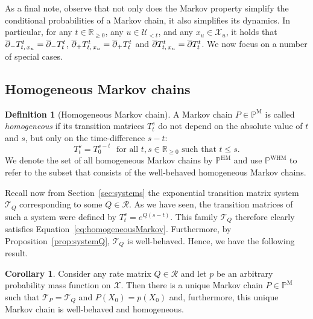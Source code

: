 \documentclass[10pt,a4paper]{paper}
\theoremstyle{definition}
\newtheorem{corollary}[theorem]{Corollary}
\newtheorem{definition}{Definition}
\newcommand{\reals}{\mathbb{R}}
\newcommand{\realsnonneg}{\reals_{\geq 0}}
\newcommand{\states}{\mathcal{X}}
\newcommand{\processes}{\mathbb{P}}
\newcommand{\mprocesses}{\processes^{\mathrm{M}}}
\newcommand{\hmprocesses}{\processes^{\mathrm{HM}}}
\newcommand{\whmprocesses}{\processes^{\mathrm{WHM}}}
\begin{document}
As a final note, observe that not only does the Markov property simplify the conditional probabilities of a Markov chain, it also simplifies its dynamics. In particular, for any $t\in\realsnonneg$, any $u\in\mathcal{U}_{<t}$, and any $x_u\in\states_u$, it holds that $\smash{\overline{\partial}_-}T_{t,\,x_u}^t=\smash{\overline{\partial}_-}T_{t}^t$, $\smash{\overline{\partial}_+}T_{t,\,x_u}^t=\smash{\overline{\partial}_+}T_{t}^t$ and $\smash{\overline{\partial}}T_{t,\,x_u}^t=\smash{\overline{\partial}}T_{t}^t$. We now focus on a number of special cases.

\subsection{Homogeneous Markov chains}\label{sec:homogen_markov_chain}

\begin{definition}[Homogeneous Markov chain]\label{def:homogeneousMarkov}
A Markov chain $P\in\mprocesses$ is called \emph{homogeneous} if its transition matrices $T_t^s$ do not depend on the absolute value of $t$ and $s$, but only on the time-difference $s-t$:
\begin{equation}\label{eq:homogeneousMarkov}
T_t^s=T_0^{s-t}
\text{~~for all $t,s\in\realsnonneg$ such that $t\leq s$.}
\end{equation}
We denote the set of all homogeneous Markov chains by $\hmprocesses$ and use $\whmprocesses$ to refer to the subset that consists of the well-behaved homogeneous Markov chains.
\end{definition}

Recall now from Section~\ref{sec:systems} the exponential transition matrix system $\mathcal{T}_Q$ corresponding to some $Q\in\mathcal{R}$. As we have seen, the transition matrices of such a system were defined by $T_t^s = e^{Q(s-t)}$. This family $\mathcal{T}_Q$ therefore clearly satisfies Equation~\ref{eq:homogeneousMarkov}. Furthermore, by Proposition~\ref{prop:systemQ}, $\mathcal{T}_Q$ is well-behaved. Hence, we have the following result.

\begin{corollary}\label{cor:rate_has_unique_homogen_markov_process}
Consider any rate matrix $Q\in\mathcal{R}$ and let $p$ be an arbitrary probability mass function on $\states$. Then there is a unique Markov chain $P\in\mprocesses$ such that $\mathcal{T}_P=\mathcal{T}_Q$ and $P(X_0)=p(X_0)$ and, furthermore, this unique Markov chain is well-behaved and homogeneous.
\end{corollary}
\end{document}
